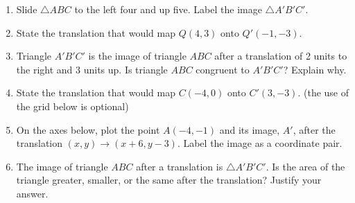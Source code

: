 \begin{enumerate}
\newpage
\item Slide $\triangle ABC$ to the left four and up five. Label the image $\triangle A'B'C'$.
  \begin{center}
  \end{center}
 
\item State the translation that would map $Q(4,3)$ onto $Q'(-1,-3)$. \vspace{2cm}

\item Triangle $A'B'C'$ is the image of triangle $ABC$ after a translation of 2 units to the right and 3 units up. Is triangle $ABC$ congruent to $A'B'C'$? Explain why. \vspace{3cm}
 
\item State the translation that would map $C(-4,0)$ onto $C'(3,-3)$. (the use of the grid below is optional)
\begin{center}
\end{center}

\item On the axes below, plot the point $A(-4,-1)$ and its image, $A'$, after the translation $(x,y) \rightarrow (x+6,y-3)$. Label the image as a coordinate pair.
    \begin{center}
  \end{center}

  \item The image of triangle $ABC$ after a translation is $\triangle A'B'C'$. Is the area of the triangle greater, smaller, or the same after the translation? Justify your answer. \vspace{3cm}


\end{enumerate}
